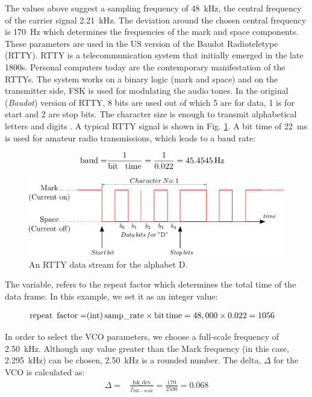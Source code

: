 \documentclass[11pt]{article}
\begin{document}
The values above suggest a sampling frequency of \SI{48}{\kHz}, the central frequency of the carrier signal \SI{2.21}{\kHz}. The deviation around the chosen central frequency is \SI{170}{\Hz} which determines the frequencies of the mark and space components. These parameters are used in the US version of the Baudot Radioteletype (RTTY). RTTY is a telecommunication system that initially emerged in the late 1800s. Personal computers today are the contemporary manifestation of the RTTYs. The system works on a binary logic (mark and space) and on the transmitter side, FSK is used for modulating the audio tones. In the original (\textit{Baudot}) version of RTTY, 8 bits are used out of which 5 are for data, 1 is for start and 2 are stop bits. The character size is enough to transmit alphabetical letters  and digits . A typical RTTY signal is shown in Fig. \ref{fig:image3}. A bit time of \SI{22}{\ms} is used for amateur radio transmissions, which leads to a baud rate:

\begin{align*}
  \text{baud} {}= & \frac{1}{\text{bit \, time}} = \frac{1}{0.022} = \SI{45.4545}{\Hz}
\end{align*}


\begin{figure}[!htb]
  \centering
  \includegraphics[width=.95\textwidth]{bit stream.pdf}
  \caption{An RTTY data stream for the alphabet D.}
  \label{fig:image3}
\end{figure}

The variable,  refers to the repeat factor which determines the total time of the data frame. In this example, we set it as an integer value:

\begin{align*}
  \text{repeat\, factor} {}= & (\text{int}) \, \mathrm{samp\_rate} \times \mathrm{bit\, time} = 48,000 \times 0.022 = 1056
\end{align*}

In order to select the VCO parameters, we choose a full-scale frequency of \SI{2.50}{\kHz}. Although any value greater than the Mark frequency (in this case, \SI{2.295}{\kHz}) can be chosen, \SI{2.50}{\kHz} is a rounded number.
The delta, $\Delta$ for the VCO is calculated as:
\begin{align*}
  \Delta {}= & \frac{\text{fsk\_dev}}{f_{\mathrm{full-scale}}} = \frac{170}{2500} = \num{0.068}
\end{align*}
\end{document}
